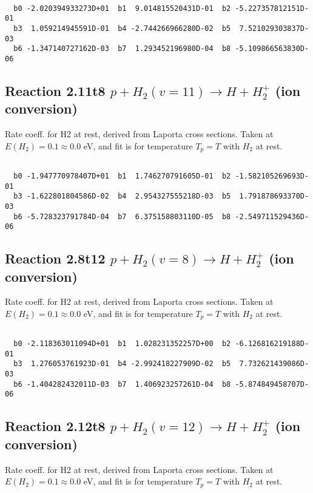 \begin{small}\begin{verbatim}

  b0 -2.020394933273D+01  b1  9.014815520431D-01  b2 -5.227357812151D-01
  b3  1.059214945591D-01  b4 -2.744266966280D-02  b5  7.521029303837D-03
  b6 -1.347140727162D-03  b7  1.293452196980D-04  b8 -5.109866563830D-06

\end{verbatim}\end{small}

\newpage
\subsection{
Reaction 2.11t8
$ p + H_2(v=11) \rightarrow H + H_2^+$ (ion conversion)
}
Rate coeff. for H2 at rest, derived from Laporta cross sections.
Taken at $E(H_2) = 0.1 \approx 0.0$ eV,  and fit is for temperature $T_p=T$ with $H_2$ at rest.

\begin{small}\begin{verbatim}

  b0 -1.947770978407D+01  b1  1.746270791605D-01  b2 -1.582105269693D-01
  b3 -1.622801804586D-02  b4  2.954327555218D-03  b5  1.791878693370D-03
  b6 -5.728323791784D-04  b7  6.375158803110D-05  b8 -2.549711529436D-06

\end{verbatim}\end{small}

\newpage
\subsection{
Reaction 2.8t12
$ p + H_2(v=8) \rightarrow H + H_2^+$ (ion conversion)
}
Rate coeff. for H2 at rest, derived from Laporta cross sections.
Taken at $E(H_2) = 0.1 \approx 0.0$ eV,  and fit is for temperature $T_p=T$ with $H_2$ at rest.

\begin{small}\begin{verbatim}

  b0 -2.118363011094D+01  b1  1.028231352257D+00  b2 -6.126816219188D-01
  b3  1.276053761923D-01  b4 -2.992418227909D-02  b5  7.732621439086D-03
  b6 -1.404282432011D-03  b7  1.406923257261D-04  b8 -5.874849458707D-06

\end{verbatim}\end{small}

\newpage
\subsection{
Reaction 2.12t8
$ p + H_2(v=12) \rightarrow H + H_2^+$ (ion conversion)
}
Rate coeff. for H2 at rest, derived from Laporta cross sections.
Taken at $E(H_2) = 0.1 \approx 0.0$ eV,  and fit is for temperature $T_p=T$ with $H_2$ at rest.

